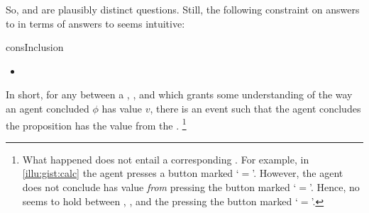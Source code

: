 \begin{note}
  So, \qWhy{} and \qHow{} are plausibly distinct questions.
  Still, the following constraint on answers to \qWhy{} in terms of answers to \qHow{} seems intuitive:

  \begin{constraint}{consInclusion}{\issueInclusion{}}
    \mbox{ }
    \vspace{-\baselineskip}
    \begin{itemize}
    \item
  \end{itemize}
  \vspace{-\baselineskip}
  \end{constraint}

  In short, for any \ros{} between a , , and \pool{} which grants some understanding of the way an agent concluded \(\phi\) has value \(v\), there is an event such that the agent concludes the proposition has the value from the \pool{}.%
  \footnote{
    What happened does not entail a corresponding \ros{}.
  For example, in \autoref{illu:gist:calc} the agent presses a button marked `\(=\)'.
  However, the agent does not conclude \propM{\gistCalcEq{}} has value  \emph{from} pressing the button marked `\(=\)'.
  Hence, no \ros{} seems to hold between \propM{\gistCalcEq{}}, , and the pressing the button marked `\(=\)'.
  }
\end{note}


